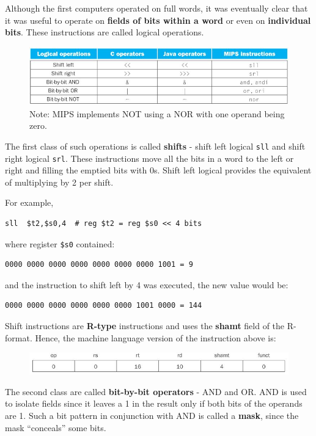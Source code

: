 \documentclass[10pt,a4paper]{article}
\begin{document}
Although the first computers operated on full words, it was eventually clear that it was useful to
operate on \textbf{fields of bits within a word} or even on \textbf{individual bits}. These
instructions are called logical operations. \par
\begin{figure} [h!]
    \centering
    \includegraphics[scale=0.8]{Logical operator.JPG}
    \caption{Note:  MIPS implements NOT using a NOR with one operand being zero.}
\end{figure}
The first class of such operations is called \textbf{shifts} - shift left logical \texttt{sll} and
shift right logical \texttt{srl}. These instructions move all the bits in a word to the left or
right and filling the emptied bits with 0s. Shift left logical provides the equivalent of
multiplying by 2 per shift. 

For example, 
\begin{lstlisting}[numbers=none]
    sll  $t2,$s0,4  # reg $t2 = reg $s0 << 4 bits
\end{lstlisting}
where register
\texttt{\$s0} contained: 
\begin{lstlisting}[numbers=none]
    0000 0000 0000 0000 0000 0000 0000 1001 = 9
\end{lstlisting}
and the instruction to shift left by 4 was executed, the new value would be:
\begin{lstlisting}[numbers=none]
    0000 0000 0000 0000 0000 0000 1001 0000 = 144
\end{lstlisting}

Shift instructions are \textbf{R-type} instructions and uses the \textbf{shamt} field of the
R-format. Hence, the machine language version of the instruction above is:
\begin{figure} [h!]
    \centering
    \includegraphics[scale=0.6]{Shift example.JPG}
\end{figure}

The second class are called \textbf{bit-by-bit operators} - AND and OR. AND is used to isolate
fields since it leaves a 1 in the result only if both bits of the operands are 1. Such a bit pattern
in conjunction with AND is called a \textbf{mask}, since the mask “conceals” some bits.
\end{document}
